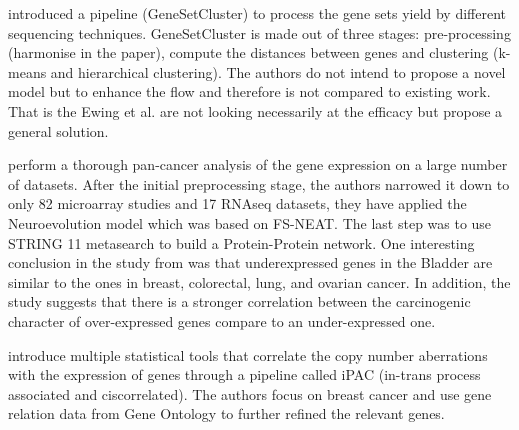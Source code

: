 \citet{Ewing2020-os} introduced a pipeline (GeneSetCluster) to process the gene sets yield by different sequencing techniques. GeneSetCluster is made out of three stages: pre-processing (harmonise in the paper), compute the distances between genes and clustering (k-means and hierarchical clustering). The authors do not intend to propose a novel model but to enhance the flow and therefore is not compared to existing work. That is the Ewing et al. are not looking necessarily at the efficacy but propose a general solution.

\citet{Feltes2020-bz} perform a thorough pan-cancer analysis of the gene expression on a large number of datasets. After the initial preprocessing stage, the authors narrowed it down to only 82 microarray studies and 17 RNAseq datasets, they have applied the Neuroevolution model\cite{Grisci2019-xn} which was based on FS-NEAT\cite{Whiteson2005-dn}. The last step was to use STRING 11\cite{Szklarczyk2019-pu} metasearch to build a Protein-Protein network. One interesting conclusion in the study from \cite{Feltes2020-bz} was that underexpressed genes in the Bladder are similar to the ones in breast, colorectal, lung, and ovarian cancer. In addition, the study suggests that there is a stronger correlation between the carcinogenic character of over-expressed genes compare to an under-expressed one.


\citet{Aure2013-je} introduce multiple statistical tools that correlate the copy number aberrations with the expression of genes through a pipeline called iPAC (in-trans process associated and ciscorrelated). The authors focus on breast cancer and use gene relation data from Gene Ontology\cite{Carbon2018-ah} to further refined the relevant genes.


